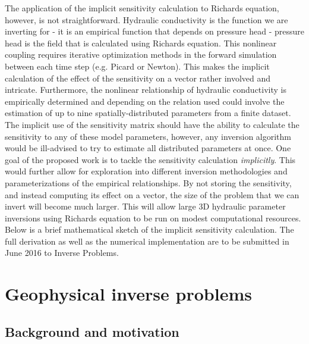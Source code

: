 \documentclass[11pt]{article}
\begin{document}
The application of the implicit sensitivity calculation to Richards equation, however, is not straightforward. Hydraulic conductivity is the function we are inverting for - it is an empirical function that depends on pressure head - pressure head is the field that is calculated using Richards equation. This nonlinear coupling requires iterative optimization methods in the forward simulation between each time step (e.g. Picard or Newton). This makes the implicit calculation of the effect of the sensitivity on a vector rather involved and intricate. Furthermore, the nonlinear relationship of hydraulic conductivity is empirically determined and depending on the relation used could involve the estimation of up to nine spatially-distributed parameters from a finite dataset. The implicit use of the sensitivity matrix should have the ability to calculate the sensitivity to any of these model parameters, however, any inversion algorithm would be ill-advised to try to estimate all distributed parameters at once. One goal of the proposed work is to tackle the sensitivity calculation \emph{implicitly}. This would further allow for exploration into different inversion methodologies and parameterizations of the empirical relationships. By not storing the sensitivity, and instead computing its effect on a vector, the size of the problem that we can invert will become much larger. This will allow large 3D hydraulic parameter inversions using Richards equation to be run on modest computational resources. Below is a brief mathematical sketch of the implicit sensitivity calculation. The full derivation as well as the numerical implementation are to be submitted in June 2016 to Inverse Problems.

\section{Geophysical inverse problems}

\subsection{Background and motivation}
\end{document}
